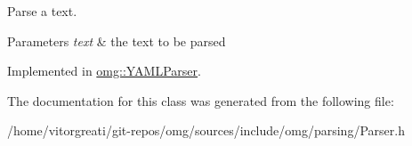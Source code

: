 Parse a text. 


\begin{DoxyParams}{Parameters}
{\em text} & the text to be parsed \\
\hline
\end{DoxyParams}


Implemented in \mbox{\hyperlink{classomg_1_1_y_a_m_l_parser_a646b059fb458cbd5b9bc3a29c1f777f4}{omg\+::\+Y\+A\+M\+L\+Parser}}.



The documentation for this class was generated from the following file\+:\begin{DoxyCompactItemize}
\item 
/home/vitorgreati/git-\/repos/omg/sources/include/omg/parsing/Parser.\+h\end{DoxyCompactItemize}
